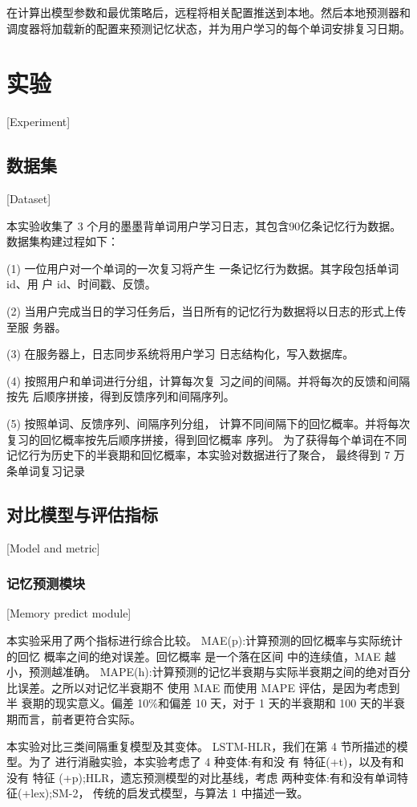 在计算出模型参数和最优策略后，远程将相关配置推送到本地。然后本地预测器和调度器将加载新的配置来预测记忆状态，并为用户学习的每个单词安排复习日期。

\chapter{实验}[Experiment]

\section{数据集}[Dataset]

本实验收集了 3 个月的墨墨背单词用户学习日志，其包含90亿条记忆行为数据。数据集构建过程如下：

(1) 一位用户对一个单词的一次复习将产生 一条记忆行为数据。其字段包括单词 id、用 户 id、时间戳、反馈。

(2) 当用户完成当日的学习任务后，当日所有的记忆行为数据将以日志的形式上传至服 务器。

(3) 在服务器上，日志同步系统将用户学习 日志结构化，写入数据库。

(4) 按照用户和单词进行分组，计算每次复 习之间的间隔。并将每次的反馈和间隔按先 后顺序拼接，得到反馈序列和间隔序列。

(5) 按照单词、反馈序列、间隔序列分组， 计算不同间隔下的回忆概率。并将每次复习的回忆概率按先后顺序拼接，得到回忆概率 序列。 为了获得每个单词在不同记忆行为历史下的半衰期和回忆概率，本实验对数据进行了聚合， 最终得到 7 万条单词复习记录

\section{对比模型与评估指标}[Model and metric]

\subsection{记忆预测模块}[Memory predict module]

本实验采用了两个指标进行综合比较。 MAE(p):计算预测的回忆概率与实际统计的回忆 概率之间的绝对误差。回忆概率 是一个落在区间 中的连续值，MAE 越小，预测越准确。 MAPE(h):计算预测的记忆半衰期与实际半衰期之间的绝对百分比误差。之所以对记忆半衰期不 使用 MAE 而使用 MAPE 评估，是因为考虑到半 衰期的现实意义。偏差 10\%和偏差 10 天，对于 1 天的半衰期和 100 天的半衰期而言，前者更符合实际。

本实验对比三类间隔重复模型及其变体。 LSTM-HLR，我们在第 4 节所描述的模型。为了 进行消融实验，本实验考虑了 4 种变体:有和没 有 特征(+t)，以及有和没有 特征 (+p);HLR，遗忘预测模型的对比基线，考虑 两种变体:有和没有单词特征(+lex);SM-2， 传统的启发式模型，与算法 1 中描述一致。

